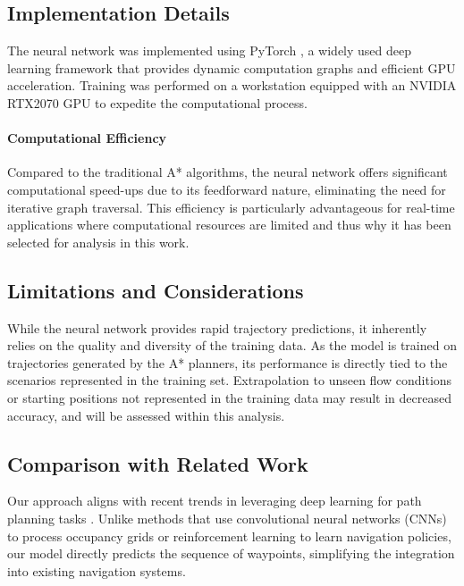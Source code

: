 \documentclass[final,5p,times,twocolumn]{elsarticle}
\begin{document}
\subsection{Implementation Details} %

The neural network was implemented using PyTorch \cite{Paszke2019}, a widely used deep learning framework that provides dynamic computation graphs and efficient GPU acceleration. Training was performed on a workstation equipped with an NVIDIA RTX2070 GPU to expedite the computational process.

\paragraph{Computational Efficiency} %

Compared to the traditional A* algorithms, the neural network offers significant computational speed-ups due to its feedforward nature, eliminating the need for iterative graph traversal. This efficiency is particularly advantageous for real-time applications where computational resources are limited and thus why it has been selected for analysis in this work.

\subsection{Limitations and Considerations} %

While the neural network provides rapid trajectory predictions, it inherently relies on the quality and diversity of the training data. As the model is trained on trajectories generated by the A* planners, its performance is directly tied to the scenarios represented in the training set. Extrapolation to unseen flow conditions or starting positions not represented in the training data may result in decreased accuracy, and will be assessed within this analysis.

\subsection{Comparison with Related Work} %

Our approach aligns with recent trends in leveraging deep learning for path planning tasks \cite{Tai2017, Pfeiffer2017}. Unlike methods that use convolutional neural networks (CNNs) to process occupancy grids or reinforcement learning to learn navigation policies, our model directly predicts the sequence of waypoints, simplifying the integration into existing navigation systems.
\end{document}
